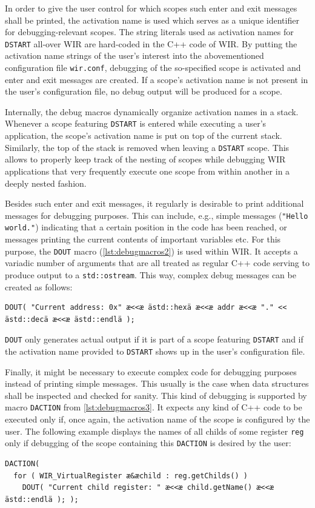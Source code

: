 In order to give the user control for which scopes such enter and exit messages shall be printed, the activation name is used which serves as a unique identifier for debugging-relevant scopes.
The string literals used as activation names for \texttt{DSTART} all-over \gls{WIR} are hard-coded in the C++ code of \gls{WIR}.
By putting the activation name strings of the user's interest into the abovementioned configuration file \texttt{wir.conf}, debugging of the so-specified scope is activated and enter and exit messages are created.
If a scope's activation name is not present in the user's configuration file, no debug output will be produced for a scope.

Internally, the debug macros dynamically organize activation names in a stack.
Whenever a scope featuring \texttt{DSTART} is entered while executing a user's application, the scope's activation name is put on top of the current stack.
Similarly, the top of the stack is removed when leaving a \texttt{DSTART} scope.
This allows to properly keep track of the nesting of scopes while debugging \gls{WIR} applications that very frequently execute one scope from within another in a deeply nested fashion.

Besides such enter and exit messages, it regularly is desirable to print additional messages for debugging purposes.
This can include, e.g., simple messages (\texttt{"Hello world."}) indicating that a certain position in the code has been reached, or messages printing the current contents of important variables etc.
For this purpose, the \texttt{DOUT} macro (\cref{lst:debugmacros2}) is used within \gls{WIR}.
It accepts a variadic number of arguments that are all treated as regular C++ code serving to produce output to a \texttt{std::ostream}.
This way, complex debug messages can be created as follows:
\begin{lstlisting}[style=code]
DOUT( "Current address: 0x" æ<<æ ästd::hexä æ<<æ addr æ<<æ "." << ästd::decä æ<<æ ästd::endlä );
\end{lstlisting}
\texttt{DOUT} only generates actual output if it is part of a scope featuring \texttt{DSTART} and if the activation name provided to \texttt{DSTART} shows up in the user's configuration file.

Finally, it might be necessary to execute complex code for debugging purposes instead of printing simple messages.
This usually is the case when data structures shall be inspected and checked for sanity.
This kind of debugging is supported by macro \texttt{DACTION} from \cref{lst:debugmacros3}.
It expects any kind of C++ code to be executed only if, once again, the activation name of the scope is configured by the user.
The following example displays the names of all childs of some register \texttt{reg} only if debugging of the scope containing this \texttt{DACTION} is desired by the user:
\begin{lstlisting}[style=code]
DACTION(
  for ( WIR_VirtualRegister æ&æchild : reg.getChilds() )
    DOUT( "Current child register: " æ<<æ child.getName() æ<<æ ästd::endlä ); );
\end{lstlisting}

